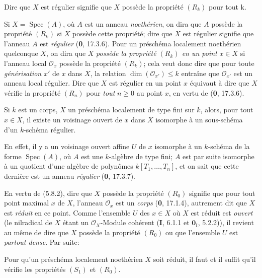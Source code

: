 Dire que $X$ est régulier signifie que $X$ possède la propriété $(R_k)$ pour
tout $\mathrm{k}$.

Si $X=\operatorname{Spec}(A)$, où $A$ est un anneau \emph{noethérien}, on dira que
$A$ possède la propriété $(R_k)$ si $X$ possède cette propriété; dire que
$X$ est régulier signifie que l'anneau $A$ est \emph{régulier} (\textbf{0}, 17.3.6). Pour un
préschéma localement noethérien quelconque $X$, on dira que $X$ \emph{possède la
propriété $(R_k)$ en un point} $x\in X$ si l'anneau local $\mathcal O_x$
possède la propriété $(R_k)$; cela veut donc dire que pour toute \emph{générisation}
$x'$ de $x$ dans $X$, la relation $\dim(\mathcal O_{x'})\leq k$ entraîne que
$\mathcal O_{x'}$ est un anneau local régulier. Dire que $X$ est régulier en
un point $x$ équivaut à dire que $X$ vérifie la propriété $(R_n)$ pour \emph{tout}
$n\geq0$ au point $x$, en vertu de (\textbf{0}, 17.3.6).

\begin{proposition}[5.8.3]
\label{IV.2.s5.8.3-fr}
Si $k$ est un corps, $X$ un préschéma localement de type fini sur $k$, alors,
pour tout $x\in X$, il existe un voisinage ouvert de $x$ dans $X$ isomorphe à
un sous-schéma d'un $k$-schéma régulier.
\end{proposition}

En effet, il y a un voisinage ouvert affine $U$ de $x$ isomorphe à un
$k$-schéma de la forme $\operatorname{Spec}(A)$, où $A$ est une $k$-algèbre
de type fini; $A$ est par suite isomorphe à un quotient d'une algèbre de
polynômes $k[T_1,\ldots,T_n]$, et on sait que cette dernière est un anneau
\emph{régulier} (\textbf{0}, 17.3.7).

\begin{env}[5.8.4]
\label{IV.2.s5.8.4-fr}
En vertu de (5.8.2), dire que $X$ possède la propriété $(R_0)$ signifie que
pour tout point maximal $x$ de $X$, l'anneau $\mathcal O_x$ est un \emph{corps}
(\textbf{0}, 17.1.4), autrement dit que $X$ est \emph{réduit} en ce point. Comme l'ensemble
$U$ des $x\in X$ où $X$ est réduit est \emph{ouvert} (le
nilradical de $X$ étant un $\mathcal O_X$-Module cohérent (\textbf{I}, 6.1.1 et
$\mathbf{0}_{\mathrm I}$, 5.2.2)), il revient au même de dire que $X$ possède la
propriété $(R_0)$ ou que l'ensemble $U$ est \emph{partout dense}. Par suite:
\end{env}

\begin{proposition}[5.8.5]
\label{IV.2.s5.8.5-fr}
Pour qu'un préschéma localement noethérien $X$ soit réduit, il faut et il
suffit qu'il vérifie les propriétés $(S_1)$ et $(R_0)$.
\end{proposition}

